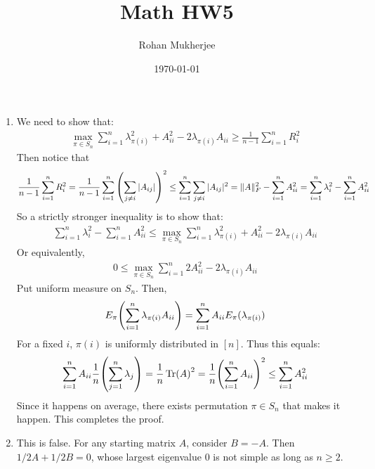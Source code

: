 \documentclass[12pt]{article}
\title{Math HW5}
\date{\today}
\author{Rohan Mukherjee}
\theoremstyle{definitionstyle}
\newcommand{\mg}[1]{\| #1 \|}
\newcommand{\1}{\mathds 1}
\begin{document}
    \maketitle
    \begin{enumerate}
        \item We need to show that:
        \begin{align*}
            \max_{\pi \in S_n} \sum_{i=1}^n \lambda_{\pi(i)}^2 + A_{ii}^2 - 2\lambda_{\pi(i)}A_{ii} \geq \frac{1}{n-1}\sum_{i=1}^n R_i^2
        \end{align*}
        Then notice that
        \begin{align*}
            \frac{1}{n-1} \sum_{i=1}^n R_i^2 = \frac{1}{n-1} \sum_{i=1}^n \qty(\sum_{j \neq i} |A_{ij}|)^2 \leq \sum_{i=1}^n \sum_{j \neq i} |A_{ij}|^2 = \mg{A}_F^2 - \sum_{i=1}^n A_{ii}^2 = \sum_{i=1}^n \lambda_i^2 - \sum_{i=1}^n A_{ii}^2
        \end{align*}
        So a strictly stronger inequality is to show that:
        \begin{align*}
            \sum_{i=1}^n \lambda_i^2 - \sum_{i=1}^n A_{ii}^2 \leq \max_{\pi \in S_n} \sum_{i=1}^n \lambda_{\pi(i)}^2 + A_{ii}^2 - 2\lambda_{\pi(i)}A_{ii}
        \end{align*}
        Or equivalently,
        \begin{align*}
            0 \leq \max_{\pi \in S_n} \sum_{i=1}^n 2A_{ii}^2 - 2 \lambda_{\pi(i)}A_{ii}
        \end{align*}
        Put uniform measure on $S_n$. Then,
        \begin{align*}
            E_{\pi}\qty(\sum_{i=1}^n \lambda_{\pi(i)}A_{ii}) = \sum_{i=1}^n A_{ii} E_{\pi}(\lambda_{\pi(i)})
        \end{align*}
        For a fixed $i$, $\pi(i)$ is uniformly distributed in $[n]$. Thus this equals:
        \begin{align*}
            \sum_{i=1}^n A_{ii} \frac{1}{n} \qty(\sum_{j=1}^n \lambda_j) = \frac{1}{n} \Tr(A)^2 = \frac{1}{n} \qty(\sum_{i=1}^n A_{ii})^2 \leq \sum_{i=1}^n A_{ii}^2
        \end{align*}
        Since it happens on average, there exists permutation $\pi \in S_n$ that makes it happen. This completes the proof.

        \item This is false. For any starting matrix $A$, consider $B = -A$. Then $1/2A + 1/2B = 0$, whose largest eigenvalue 0 is not simple as long as $n \geq 2$.


\end{enumerate}
\end{document}
